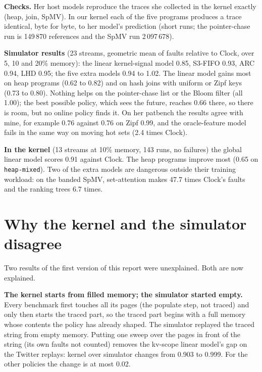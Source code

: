 \documentclass[10.5pt,a4paper]{article}
\newcommand{\code}[1]{\texttt{#1}}
\begin{document}
\textbf{Checks.} Her host models reproduce the traces she collected in the kernel exactly (heap, join, SpMV). In our kernel each of the
five programs produces a trace identical, byte for byte, to her model's prediction (short runs; the pointer-chase run is 149\,870 references
and the SpMV run 2\,097\,678).

\textbf{Simulator results} (23 streams, geometric mean of faults relative to Clock, over 5, 10 and 20\% memory): the linear kernel-signal
model 0.85, S3-FIFO 0.93, ARC 0.94, LHD 0.95; the five extra models 0.94 to 1.02. The linear model gains most on heap programs (0.62 to 0.82)
and on hash joins with uniform or Zipf keys (0.73 to 0.80). Nothing helps on the pointer-chase list or the Bloom filter (all 1.00); the best possible policy,
which sees the future, reaches 0.66 there, so there is room, but no online policy finds it. On her patbench the results agree with mine, for example 0.76 against 0.76 on
Zipf 0.99, and the oracle-feature model fails in the same way on moving hot sets (2.4 times Clock).

\textbf{In the kernel} (13 streams at 10\% memory, 143 runs, no failures) the global linear model scores 0.91 against Clock. The heap programs
improve most (0.65 on \code{heap-mixed}). Two of the extra models are dangerous outside their training workload: on the banded SpMV,
set-attention makes 47.7 times Clock's faults and the ranking trees 6.7 times.

\section{Why the kernel and the simulator disagree}
\label{sec:gap}

Two results of the first version of this report were unexplained. Both are now explained.

\textbf{The kernel starts from filled memory; the simulator started empty.} Every benchmark first touches all its pages (the
populate step, not traced) and only then starts the traced part, so the traced part begins with a full memory whose contents the
policy has already shaped. The simulator replayed the traced string from empty memory. Putting one sweep over the pages in front of the string
(its own faults not counted) removes the kv-scope linear model's gap on the Twitter replays: kernel over simulator changes from 0.903 to 0.999.
For the other policies the change is at most 0.02.

\begin{table}[h]
\centering\small

\caption{Kernel faults over simulator faults (geometric mean over streams) with the simulator started empty and started from filled memory.}
\end{table}
\end{document}
